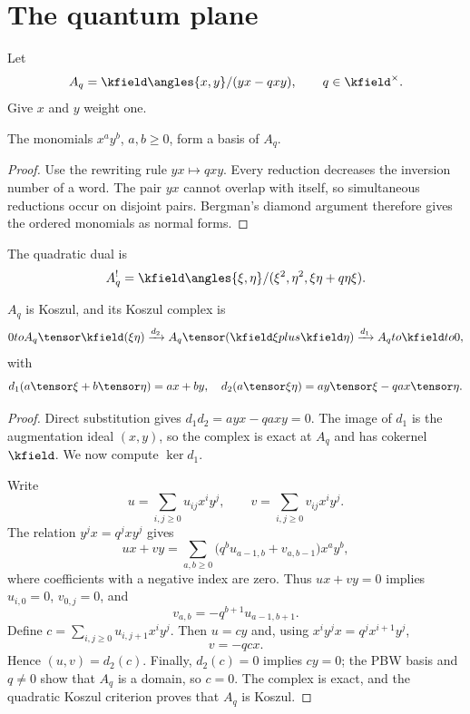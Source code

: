 \chapter{The quantum plane}
Let
\[
 A_q=\kfield\angles{x,y}/(yx-qxy),\qquad q\in\kfield^\times.
\]
Give $x$ and $y$ weight one.

\begin{theorem}
The monomials $x^ay^b$, $a,b\ge0$, form a basis of $A_q$.
\end{theorem}
\begin{proof}
Use the rewriting rule $yx\mapsto qxy$. Every reduction decreases the inversion number of a word. The pair $yx$ cannot overlap with itself, so simultaneous reductions occur on disjoint pairs. Bergman's diamond argument therefore gives the ordered monomials as normal forms.
\end{proof}

The quadratic dual is
\[
 A_q^!=\kfield\angles{\xi,\eta}/(\xi^2,\eta^2,\xi\eta+q\eta\xi).
\]

\begin{theorem}[Koszulness]
$A_q$ is Koszul, and its Koszul complex is
\[
 0\to A_q\tensor\kfield(\xi\eta)
 \xrightarrow{d_2}
 A_q\tensor(\kfield\xi\oplus\kfield\eta)
 \xrightarrow{d_1}A_q\to\kfield\to0,
\]
with
\[
 d_1(a\tensor\xi+b\tensor\eta)=ax+by,
\quad
 d_2(a\tensor\xi\eta)=ay\tensor\xi-qax\tensor\eta.
\]
\end{theorem}
\begin{proof}
Direct substitution gives $d_1d_2=ayx-qaxy=0$. The image of $d_1$ is the augmentation ideal $(x,y)$, so the complex is exact at $A_q$ and has cokernel $\kfield$. We now compute $\ker d_1$.

Write
\[
 u=\sum_{i,j\ge0}u_{ij}x^iy^j,
 \qquad
 v=\sum_{i,j\ge0}v_{ij}x^iy^j.
\]
The relation $y^jx=q^jxy^j$ gives
\[
 ux+vy=\sum_{a,b\ge0}
 \bigl(q^b u_{a-1,b}+v_{a,b-1}\bigr)x^ay^b,
\]
where coefficients with a negative index are zero. Thus $ux+vy=0$ implies $u_{i,0}=0$, $v_{0,j}=0$, and
\[
 v_{a,b}=-q^{b+1}u_{a-1,b+1}.
\]
Define $c=\sum_{i,j\ge0}u_{i,j+1}x^iy^j$. Then $u=cy$ and, using $x^iy^jx=q^jx^{i+1}y^j$,
\[
 v=-qcx.
\]
Hence $(u,v)=d_2(c)$. Finally, $d_2(c)=0$ implies $cy=0$; the PBW basis and $q\ne0$ show that $A_q$ is a domain, so $c=0$. The complex is exact, and the quadratic Koszul criterion proves that $A_q$ is Koszul.
\end{proof}

